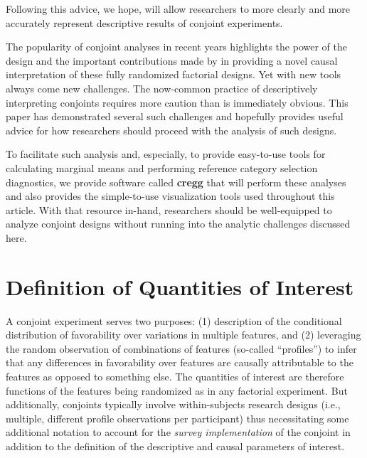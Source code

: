 \documentclass[a4paper,12pt]{article}\usepackage[]{graphicx}\usepackage[]{color}
\begin{document}
\noindent Following this advice, we hope, will allow researchers to more clearly and more accurately represent descriptive results of conjoint experiments.

The popularity of conjoint analyses in recent years highlights the power of the design and the important contributions made by \citet{HainmuellerHopkinsYamamoto2014} in providing a novel causal interpretation of these fully randomized factorial designs. Yet with new tools always come new challenges. The now-common practice of descriptively interpreting conjoints requires more caution than is immediately obvious. This paper has demonstrated several such challenges and hopefully provides useful advice for how researchers should proceed with the analysis of such designs.

To facilitate such analysis and, especially, to provide easy-to-use tools for calculating marginal means and performing reference category selection diagnostics, we provide software called \textbf{cregg} \citep{Leeper2018cregg} that will perform these analyses and also provides the simple-to-use visualization tools used throughout this article. With that resource in-hand, researchers should be well-equipped to analyze conjoint designs without running into the analytic challenges discussed here.




\singlespacing


\clearpage


\appendix
\tableofcontents



\clearpage

\section{Definition of Quantities of Interest}\label{app:quantities}

A conjoint experiment serves two purposes: (1) description of the conditional distribution of favorability over variations in multiple features, and (2) leveraging the random observation of combinations of features (so-called ``profiles'') to infer that any differences in favorability over features are causally attributable to the features as opposed to something else. The quantities of interest are therefore functions of the features being randomized as in any factorial experiment. But additionally, conjoints typically involve within-subjects research designs (i.e., multiple, different profile observations per participant) thus necessitating some additional notation to account for the \textit{survey implementation} of the conjoint in addition to the definition of the descriptive and causal parameters of interest.
\end{document}
